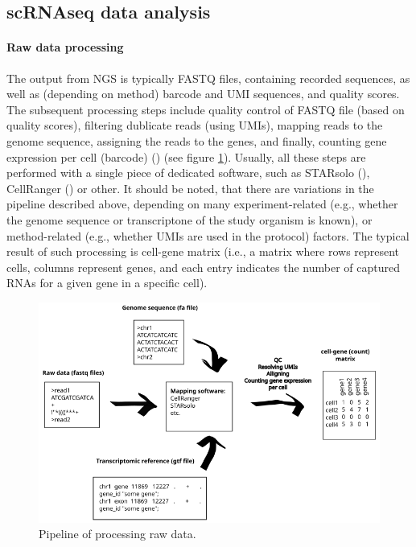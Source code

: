 \subsection{scRNAseq data analysis}

\paragraph{Raw data processing}

The output from NGS is typically FASTQ files, containing recorded sequences,
as well as (depending on method) barcode and UMI sequences, and quality scores.
The subsequent processing steps include quality control of FASTQ file (based on quality scores),
filtering dublicate reads (using UMIs), mapping reads to the genome sequence, assigning the reads to the genes,
and finally, counting gene expression per cell (barcode) (\cite{Heumos2023}) (see figure \ref{fig:rawData}).
Usually, all these steps are performed with a single piece of dedicated software,
such as STARsolo (\cite{Kaminow2021}), CellRanger (\cite{Zheng2017}) or other.
It should be noted, that there are variations in the pipeline described above,
depending on many experiment-related (e.g., whether the genome sequence or transcriptone of the study organism is known),
or method-related (e.g., whether UMIs are used in the protocol) factors.
The typical result of such processing is cell-gene matrix (i.e., a matrix where rows represent cells,
columns represent genes, and each entry indicates the number of captured RNAs for a given gene in a specific cell).

\begin{figure}
  \centering
  \includegraphics[width=\linewidth]{images/rawdata.png}
  \caption{Pipeline of processing raw data.}
  \label{fig:rawData}
\end{figure}

